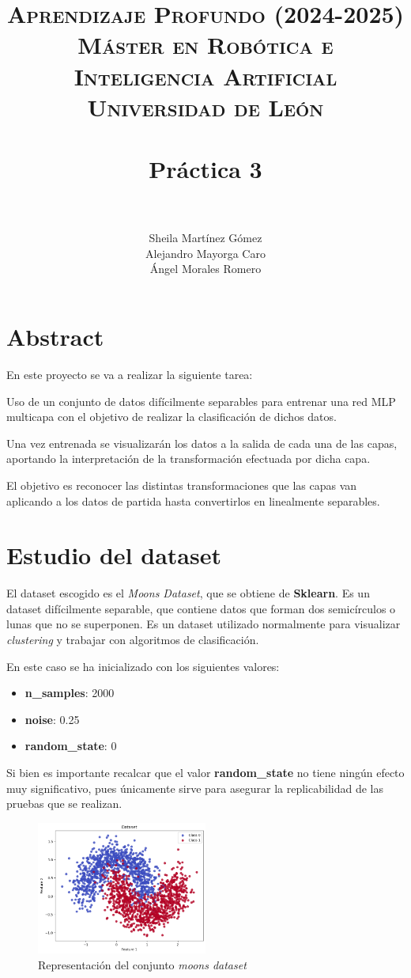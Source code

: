 \documentclass[paper=a4, fontsize=11pt]{scrartcl} %
\title{	
\normalfont \normalsize 
\textsc{{\textbf{Aprendizaje Profundo (2024-2025)}} \\ Máster en Robótica e Inteligencia Artificial \\ Universidad de León} \\ [20pt] %
\horrule{0.5pt} \\[0.4cm] %
\huge Práctica 3 \\   %
\horrule{1.5pt} \\[0.2cm] %
}
\author{Sheila Martínez Gómez\\
Alejandro Mayorga Caro\\
Ángel Morales Romero\\
}
\numberwithin{equation}{section} %
\numberwithin{figure}{section} %
\numberwithin{table}{section} %
\begin{document}
\maketitle
\newpage %

\tableofcontents %
\pagebreak

\section{Abstract}

En este proyecto se va a realizar la siguiente tarea:

Uso de un conjunto de datos difícilmente separables para entrenar una red MLP multicapa con el objetivo de realizar la clasificación de dichos datos. 

Una vez entrenada se visualizarán los datos a la salida de cada una de las capas, aportando la interpretación de la transformación efectuada por dicha capa. 

El objetivo es reconocer las distintas transformaciones que las capas van aplicando a los datos de partida hasta convertirlos en linealmente separables.

\section{Estudio del dataset}

El dataset escogido es el \textit{Moons Dataset}, que se obtiene de \textbf{Sklearn}. Es un dataset difícilmente separable, que contiene datos que forman dos semicírculos o lunas que no se superponen. Es un dataset utilizado normalmente para visualizar \textit{clustering} y trabajar con algoritmos de clasificación. 

En este caso se ha inicializado con los siguientes valores:
\begin{itemize}
    \item \textbf{n\_samples}: 2000
    \item \textbf{noise}: 0.25
    \item \textbf{random\_state}: 0
\end{itemize}

Si bien es importante recalcar que el valor \textbf{random\_state} no tiene ningún efecto muy significativo, pues únicamente sirve para asegurar la replicabilidad de las pruebas que se realizan. 

\begin{figure}[H]
\caption{Representación del conjunto \textit{moons dataset}}
\centering
\includegraphics[width=0.5\textwidth]{images/moons_plot.png}
\end{figure}
\end{document}
